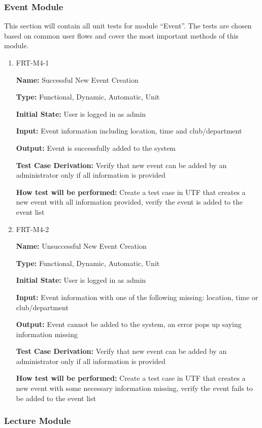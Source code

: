 \documentclass[12pt, titlepage]{article}
\begin{document}
\subsubsection{Event Module}

This section will contain all unit tests for module ``Event''. The tests are chosen based on common user flows and cover the most important methods of this module.

\begin{enumerate}
\item{FRT-M4-1}

\textbf{Name:} Successful New Event Creation

\textbf{Type:} Functional, Dynamic, Automatic, Unit
					
\textbf{Initial State:} User is logged in as admin
					
\textbf{Input:} Event information including location, time and club/department
					
\textbf{Output:} Event is successfully added to the system

\textbf{Test Case Derivation:} Verify that new event can be added by an administrator only if all information is provided

\textbf{How test will be performed:} Create a test case in UTF that creates a new event with all information provided, verify the event is added to the event list

\item{FRT-M4-2}

\textbf{Name:} Unsuccessful New Event Creation

\textbf{Type:} Functional, Dynamic, Automatic, Unit
					
\textbf{Initial State:} User is logged in as admin
					
\textbf{Input:} Event information with one of the following missing: location, time or club/department
					
\textbf{Output:} Event cannot be added to the system, an error pops up saying information missing

\textbf{Test Case Derivation:} Verify that new event can be added by an administrator only if all information is provided

\textbf{How test will be performed:} Create a test case in UTF that creates a new event with some necessary information missing, verify the event fails to be added to the event list
\end{enumerate}

\subsubsection{Lecture Module}
\end{document}
